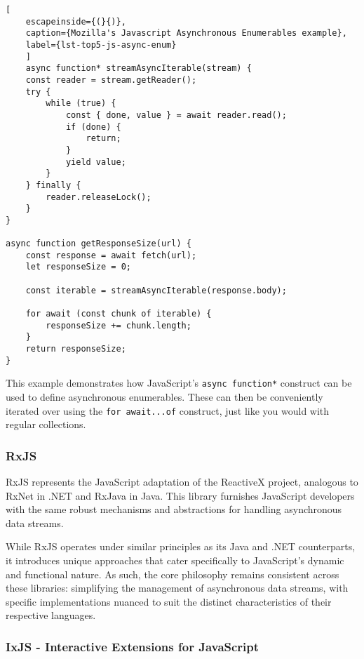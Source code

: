\begin{center}
	\lstset{basicstyle=\scriptsize\ttfamily,frame=bottomline}
	\centering
	\begin{lstlisting}[
	escapeinside={(}{)},
	caption={Mozilla's Javascript Asynchronous Enumerables example},
	label={lst-top5-js-async-enum}
	]
	async function* streamAsyncIterable(stream) {
    const reader = stream.getReader();
    try {
        while (true) {
            const { done, value } = await reader.read();
            if (done) {
                return;
            }
            yield value;
        }
    } finally {
        reader.releaseLock();
    }
}

async function getResponseSize(url) {
    const response = await fetch(url);
    let responseSize = 0;

    const iterable = streamAsyncIterable(response.body);

    for await (const chunk of iterable) {
        responseSize += chunk.length;
    }
    return responseSize;
}
		\end{lstlisting}
	\end{center}

This example demonstrates how JavaScript's \texttt{async function*} construct can be used to define asynchronous enumerables. These can then be conveniently iterated over using the \texttt{for await...of} construct, just like you would with regular collections.


\subsubsection{RxJS}
\label{rxjs}

RxJS represents the JavaScript adaptation of the ReactiveX project, analogous to RxNet in .NET and RxJava in Java. This library furnishes JavaScript developers with the same robust mechanisms and abstractions for handling asynchronous data streams. 

While RxJS operates under similar principles as its Java and .NET counterparts, it introduces unique approaches that cater specifically to JavaScript's dynamic and functional nature. As such, the core philosophy remains consistent across these libraries: simplifying the management of asynchronous data streams, with specific implementations nuanced to suit the distinct characteristics of their respective languages.


\subsubsection{IxJS - Interactive Extensions for JavaScript}
\label{ixjs}

